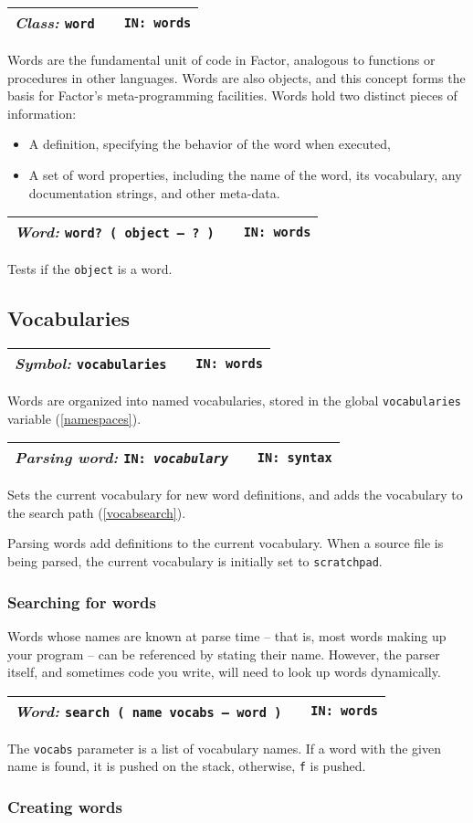 \documentclass{report}
\newcommand{\parsingword}[3]{\index{#1}
\emph{Parsing word:} \texttt{#2} &&\texttt{IN: #3}}
\newcommand{\ordinaryword}[3]{\index{#1}
\emph{Word:} \texttt{#2} &&\texttt{IN: #3}}
\newcommand{\symbolword}[2]{\index{#1}
\emph{Symbol:} \texttt{#1} &&\texttt{IN: #2}}
\newcommand{\classword}[2]{\index{#1}
\emph{Class:} \texttt{#1} &&\texttt{IN: #2}}
\newcommand{\wordtable}[1]{

\begin{tabularx}{12cm}[t]{lXr}
\hline
#1\\
\hline
\end{tabularx}

}
\begin{document}
\wordglos
\vocabglos
{}
\wordtable{
\classword{word}{words}
}
Words are the fundamental unit of code in Factor, analogous to functions or procedures in other languages. Words are also objects, and this concept forms the basis for Factor's meta-programming facilities. Words hold two distinct pieces of information:
\begin{itemize}
\item A definition, specifying the behavior of the word when executed,
\item A set of word properties, including the name of the word, its vocabulary, any documentation strings, and other meta-data.
\end{itemize}
\wordtable{
\ordinaryword{word?}{word?~( object -- ?~)}{words}
}
Tests if the \texttt{object} is a word.

\subsection{Vocabularies}
\wordtable{
\symbolword{vocabularies}{words}
}
Words are organized into named vocabularies, stored in the global \texttt{vocabularies} variable (\ref{namespaces}).
\wordtable{
\parsingword{IN:}{IN:~\emph{vocabulary}}{syntax}
}
Sets the current vocabulary for new word definitions, and adds the vocabulary to the search path (\ref{vocabsearch}).

Parsing words add definitions to the current vocabulary. When a source file is being parsed, the current vocabulary is initially set to \texttt{scratchpad}.

\subsubsection{Searching for words}

Words whose names are known at parse time -- that is, most words making up your program -- can be referenced by stating their name. However, the parser itself, and sometimes code you write, will need to look up words dynamically.
\wordtable{
\ordinaryword{search}{search ( name vocabs -- word )}{words}
}
The \texttt{vocabs} parameter is a list of vocabulary names. If a word with the given name is found, it is pushed on the stack, otherwise, \texttt{f} is pushed.

\subsubsection{Creating words}
\end{document}
